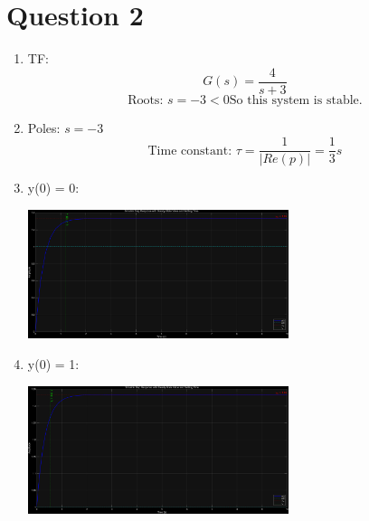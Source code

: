 \documentclass[12pt]{article}
\begin{document}
\section*{Question 2}
    \begin{enumerate}[label=(\alph*)]
        \item TF:
        \[G(s) = \frac{4}{s+3}\]
        \[\text{Roots: } s = -3 < 0 \text{So this system is stable.}\]
        
        \item Poles: $s = -3$
        \[\text{Time constant: } \tau = \frac{1}{|Re(p)|} = \frac{1}{3}s\]

        \item y(0) = 0:
        \begin{center}
            \includegraphics[width=0.6\textwidth]{Q2c.png}
        \end{center}

        \item y(0) = 1:
        \begin{center}
            \includegraphics[width=0.6\textwidth]{Q2d.png}
        \end{center}

    \end{enumerate}
\end{document}
